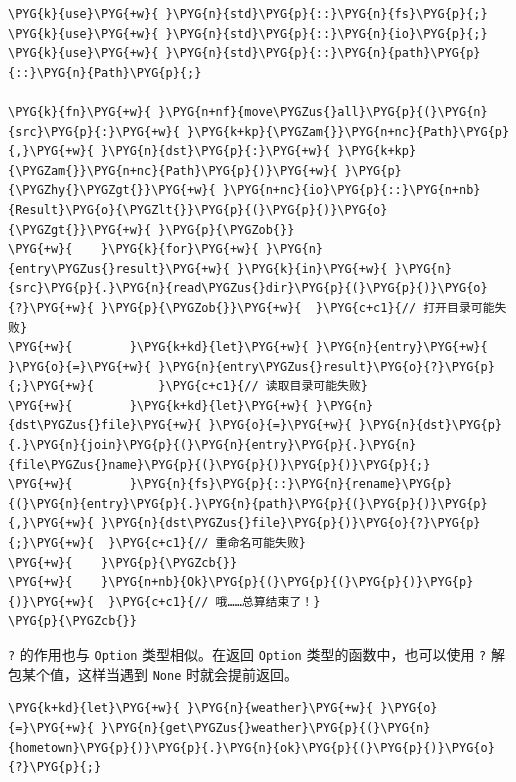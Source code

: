 \begin{Verbatim}[commandchars=\\\{\},breaklines=true,breakanywhere=true,fontsize=\codefont,xleftmargin=17bp]
\PYG{k}{use}\PYG{+w}{ }\PYG{n}{std}\PYG{p}{::}\PYG{n}{fs}\PYG{p}{;}
\PYG{k}{use}\PYG{+w}{ }\PYG{n}{std}\PYG{p}{::}\PYG{n}{io}\PYG{p}{;}
\PYG{k}{use}\PYG{+w}{ }\PYG{n}{std}\PYG{p}{::}\PYG{n}{path}\PYG{p}{::}\PYG{n}{Path}\PYG{p}{;}

\PYG{k}{fn}\PYG{+w}{ }\PYG{n+nf}{move\PYGZus{}all}\PYG{p}{(}\PYG{n}{src}\PYG{p}{:}\PYG{+w}{ }\PYG{k+kp}{\PYGZam{}}\PYG{n+nc}{Path}\PYG{p}{,}\PYG{+w}{ }\PYG{n}{dst}\PYG{p}{:}\PYG{+w}{ }\PYG{k+kp}{\PYGZam{}}\PYG{n+nc}{Path}\PYG{p}{)}\PYG{+w}{ }\PYG{p}{\PYGZhy{}\PYGZgt{}}\PYG{+w}{ }\PYG{n+nc}{io}\PYG{p}{::}\PYG{n+nb}{Result}\PYG{o}{\PYGZlt{}}\PYG{p}{(}\PYG{p}{)}\PYG{o}{\PYGZgt{}}\PYG{+w}{ }\PYG{p}{\PYGZob{}}
\PYG{+w}{    }\PYG{k}{for}\PYG{+w}{ }\PYG{n}{entry\PYGZus{}result}\PYG{+w}{ }\PYG{k}{in}\PYG{+w}{ }\PYG{n}{src}\PYG{p}{.}\PYG{n}{read\PYGZus{}dir}\PYG{p}{(}\PYG{p}{)}\PYG{o}{?}\PYG{+w}{ }\PYG{p}{\PYGZob{}}\PYG{+w}{  }\PYG{c+c1}{// 打开目录可能失败}
\PYG{+w}{        }\PYG{k+kd}{let}\PYG{+w}{ }\PYG{n}{entry}\PYG{+w}{ }\PYG{o}{=}\PYG{+w}{ }\PYG{n}{entry\PYGZus{}result}\PYG{o}{?}\PYG{p}{;}\PYG{+w}{         }\PYG{c+c1}{// 读取目录可能失败}
\PYG{+w}{        }\PYG{k+kd}{let}\PYG{+w}{ }\PYG{n}{dst\PYGZus{}file}\PYG{+w}{ }\PYG{o}{=}\PYG{+w}{ }\PYG{n}{dst}\PYG{p}{.}\PYG{n}{join}\PYG{p}{(}\PYG{n}{entry}\PYG{p}{.}\PYG{n}{file\PYGZus{}name}\PYG{p}{(}\PYG{p}{)}\PYG{p}{)}\PYG{p}{;}
\PYG{+w}{        }\PYG{n}{fs}\PYG{p}{::}\PYG{n}{rename}\PYG{p}{(}\PYG{n}{entry}\PYG{p}{.}\PYG{n}{path}\PYG{p}{(}\PYG{p}{)}\PYG{p}{,}\PYG{+w}{ }\PYG{n}{dst\PYGZus{}file}\PYG{p}{)}\PYG{o}{?}\PYG{p}{;}\PYG{+w}{  }\PYG{c+c1}{// 重命名可能失败}
\PYG{+w}{    }\PYG{p}{\PYGZcb{}}
\PYG{+w}{    }\PYG{n+nb}{Ok}\PYG{p}{(}\PYG{p}{(}\PYG{p}{)}\PYG{p}{)}\PYG{+w}{  }\PYG{c+c1}{// 哦……总算结束了！}
\PYG{p}{\PYGZcb{}}
\end{Verbatim}

\texttt{?} 的作用也与 \texttt{Option} 类型相似。在返回 \texttt{Option} 类型的函数中，也可以使用 \texttt{?} 解包某个值，这样当遇到 \texttt{None} 时就会提前返回。

\begin{Verbatim}[commandchars=\\\{\},breaklines=true,breakanywhere=true,fontsize=\codefont,xleftmargin=17bp]
\PYG{k+kd}{let}\PYG{+w}{ }\PYG{n}{weather}\PYG{+w}{ }\PYG{o}{=}\PYG{+w}{ }\PYG{n}{get\PYGZus{}weather}\PYG{p}{(}\PYG{n}{hometown}\PYG{p}{)}\PYG{p}{.}\PYG{n}{ok}\PYG{p}{(}\PYG{p}{)}\PYG{o}{?}\PYG{p}{;}
\end{Verbatim}


